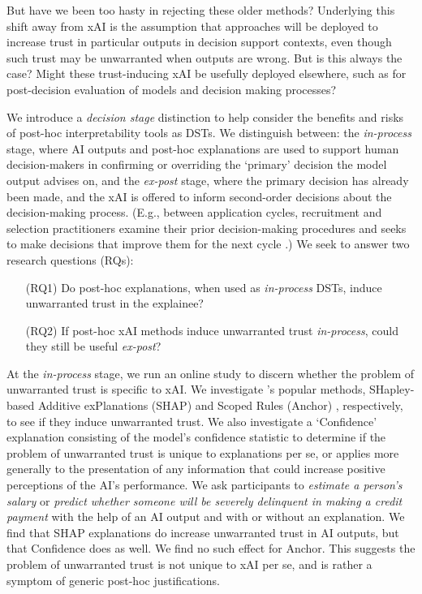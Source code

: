But have we been too hasty in rejecting these older methods? Underlying this shift away from xAI is the assumption that approaches will be deployed to increase trust in particular outputs in decision support contexts, even though such trust may be unwarranted when outputs are wrong. But is this always the case? Might these trust-inducing xAI be usefully deployed elsewhere, such as for post-decision evaluation of models and decision making processes?

We introduce a \emph{decision stage} distinction to help consider the benefits and risks of post-hoc interpretability tools as DSTs. We distinguish between: the \emph{in-process} stage, where AI outputs and post-hoc explanations are used to support human decision-makers in confirming or overriding the `primary' decision the model output advises on, and the \emph{ex-post} stage, where the primary decision has already been made, and the xAI is offered to inform second-order decisions about the decision-making process. (E.g., between application cycles, recruitment and selection practitioners examine their prior decision-making procedures and seeks to make decisions that improve them for the next cycle \cite{li2020hiring}.) We seek to answer two research questions (RQs):

\begin{enumerate}
    \item[(RQ1)] Do post-hoc explanations, when used as \emph{in-process} DSTs, induce unwarranted trust in the explainee?
    \item[(RQ2)] If post-hoc xAI methods induce unwarranted trust \emph{in-process}, could they still be useful \emph{ex-post}?
\end{enumerate}

At the \emph{in-process} stage, we run an online study to discern whether the problem of unwarranted trust is specific to xAI. We investigate \textcite{lundberg_unified_2017,ribeiro_anchors_2018}'s popular methods, SHapley-based Additive exPlanations (SHAP) \cite{lundberg_unified_2017} and Scoped Rules (Anchor) \cite{ribeiro_anchors_2018}, respectively, to see if they induce unwarranted trust. We also investigate a `Confidence' explanation consisting of the model's confidence statistic to determine if the problem of unwarranted trust is unique to explanations per se, or applies more generally to the presentation of any information that could increase positive perceptions of the AI's performance. We ask participants to \emph{estimate a person's salary} \cite{kohavi_scaling_1996} or \emph{predict whether someone will be severely delinquent in making a credit payment} \cite{GiveMeSomeCredit} with the help of an AI output and with or without an explanation. We find that SHAP explanations do increase unwarranted trust in AI outputs, but that Confidence does as well. We find no such effect for Anchor. This suggests the problem of unwarranted trust is not unique to xAI per se, and is rather a symptom of generic post-hoc justifications.

